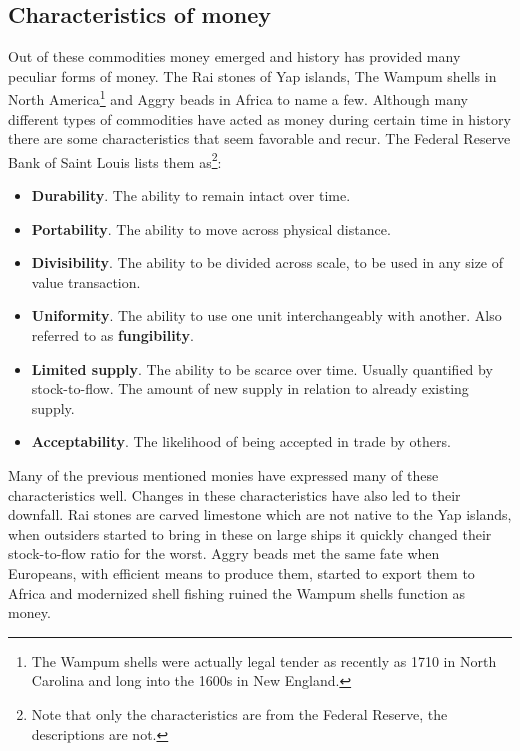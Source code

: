 \subsection{Characteristics of money}
	\label{sec:characteristics:money}

Out of these commodities money emerged and history has provided many peculiar forms of money. The Rai stones of Yap islands, The Wampum shells in North America\footnote{The Wampum shells were actually legal tender as recently as 1710 in North Carolina and long into the 1600s in New England.}\cite{szabo:shelling:out} and Aggry beads in Africa to name a few. Although many different types of commodities have acted as money during certain time in history there are some characteristics that seem favorable and recur. The Federal Reserve Bank of Saint Louis lists them as\cite{fed:function:money}\footnote{Note that only the characteristics are from the Federal Reserve, the descriptions are not.}:

\begin{itemize}
	\item \textbf{Durability}. The ability to remain intact over time.
	
	\item \textbf{Portability}. The ability to move across physical distance.
	
	\item \textbf{Divisibility}. The ability to be divided across scale, to be used in any size of value transaction.
	
	\item \textbf{Uniformity}. The ability to use one unit interchangeably with another. Also referred to as \textbf{fungibility}.
	
	\item \textbf{Limited supply}. The ability to be scarce over time. Usually quantified by stock-to-flow. The amount of new supply in relation to already existing supply.
	
	\item \textbf{Acceptability}. The likelihood of being accepted in trade by others.
\end{itemize}

Many of the previous mentioned monies have expressed many of these characteristics well. Changes in these characteristics have also led to their downfall. Rai stones are carved limestone which are not native to the Yap islands, when outsiders started to bring in these on large ships it quickly changed their stock-to-flow ratio for the worst\cite{ammous:bitcoin:standard}. Aggry beads met the same fate when Europeans, with efficient means to produce them, started to export them to Africa and modernized shell fishing ruined the Wampum shells function as money\cite{szabo:shelling:out}.

